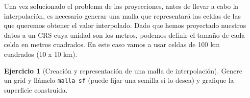 \documentclass[
]{book}
\newenvironment{Shaded}{\begin{snugshade}}{\end{snugshade}}
\newcommand{\AttributeTok}[1]{\textcolor[rgb]{0.77,0.63,0.00}{#1}}
\newcommand{\CommentTok}[1]{\textcolor[rgb]{0.56,0.35,0.01}{\textit{#1}}}
\newcommand{\DecValTok}[1]{\textcolor[rgb]{0.00,0.00,0.81}{#1}}
\newcommand{\FunctionTok}[1]{\textcolor[rgb]{0.00,0.00,0.00}{#1}}
\newcommand{\NormalTok}[1]{#1}
\newcommand{\OtherTok}[1]{\textcolor[rgb]{0.56,0.35,0.01}{#1}}
\newcommand{\SpecialCharTok}[1]{\textcolor[rgb]{0.00,0.00,0.00}{#1}}
\newcommand{\StringTok}[1]{\textcolor[rgb]{0.31,0.60,0.02}{#1}}
\theoremstyle{definition}
\theoremstyle{definition}
\theoremstyle{definition}
\newtheorem{exercise}{Ejercicio}[chapter]
\theoremstyle{definition}
\theoremstyle{remark}
\begin{document}
\begin{Shaded}
\end{Shaded}

Una vez solucionado el problema de las proyecciones, antes de llevar a cabo la
interpolación, es necesario generar una malla que representará las celdas de las
que queremos obtener el valor interpolado. Dado que hemos proyectado nuestros
datos a un CRS cuya unidad son los metros, podemos definir el tamaño de cada
celda en metros cuadrados. En este caso vamos a usar celdas de 100 km cuadrados
(10 x 10 km).

\begin{exercise}[Creación y representación de una malla de interpolación]
\protect\hypertarget{exr:ex12}{}\label{exr:ex12}Genere un grid y llámelo \texttt{malla\_sf} (puede fijar una semilla si lo desea) y
grafique la superficie construida.
\end{exercise}
\end{document}
